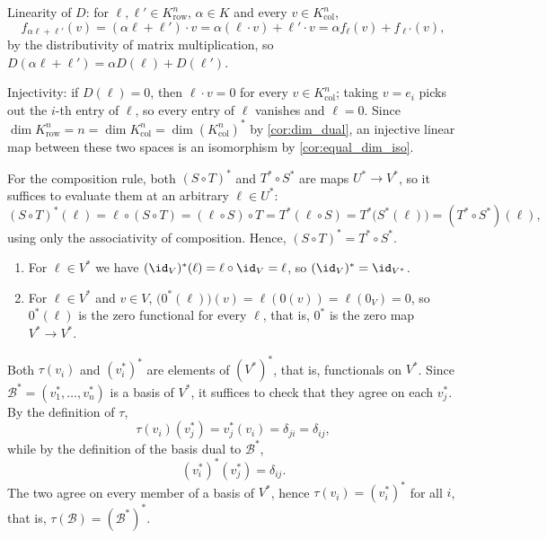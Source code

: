 \begin{exercisesolution}
\label{sol:row_space_is_dual}
Linearity of $D$: for $\ell, \ell' \in K^n_{\text{row}}$, $\alpha \in K$ and every $v \in K^n_{\text{col}}$,
\[
f_{\alpha \ell + \ell'}(v) = (\alpha \ell + \ell') \cdot v = \alpha (\ell \cdot v) + \ell' \cdot v = \alpha f_{\ell}(v) + f_{\ell'}(v),
\]
by the distributivity of matrix multiplication, so $D(\alpha \ell + \ell') = \alpha D(\ell) + D(\ell')$.

Injectivity: if $D(\ell) = 0$, then $\ell \cdot v = 0$ for every $v \in K^n_{\text{col}}$; taking $v = e_i$ picks out the $i$-th entry of $\ell$, so every entry of $\ell$ vanishes and $\ell = 0$. Since $\dim K^n_{\text{row}} = n = \dim K^n_{\text{col}} = \dim (K^n_{\text{col}})^*$ by \cref{cor:dim_dual}, an injective linear map between these two spaces is an isomorphism by \cref{cor:equal_dim_iso}.
\end{exercisesolution}

\begin{exercisesolution}
\label{sol:dual_functoriality}
For the composition rule, both $(S \circ T)^*$ and $T^* \circ S^*$ are maps $U^* \to V^*$, so it suffices to evaluate them at an arbitrary $\ell \in U^*$:
\[
(S \circ T)^*(\ell) = \ell \circ (S \circ T) = (\ell \circ S) \circ T = T^*(\ell \circ S) = T^*\big(S^*(\ell)\big) = (T^* \circ S^*)(\ell),
\]
using only the associativity of composition. Hence, $(S \circ T)^* = T^* \circ S^*$.

\begin{enumerate}[label=\textbf{(\alph*)}]
    \item For $\ell \in V^*$ we have $(\id_V)^*(\ell) = \ell \circ \id_V = \ell$, so $(\id_V)^* = \id_{V^*}$.
    \item For $\ell \in V^*$ and $v \in V$, $\big(0^*(\ell)\big)(v) = \ell(0(v)) = \ell(0_V) = 0$, so $0^*(\ell)$ is the zero functional for every $\ell$, that is, $0^*$ is the zero map $V^* \to V^*$. \qedhere
\end{enumerate}
\end{exercisesolution}

\begin{exercisesolution}
\label{sol:tau_on_dual_bases}
Both $\tau(v_i)$ and $(v_i^*)^*$ are elements of $(V^*)^*$, that is, functionals on $V^*$. Since $\mathcal{B}^* = (v_1^*, \dots, v_n^*)$ is a basis of $V^*$, it suffices to check that they agree on each $v_j^*$. By the definition of $\tau$,
\[
\tau(v_i)(v_j^*) = v_j^*(v_i) = \delta_{ji} = \delta_{ij},
\]
while by the definition of the basis dual to $\mathcal{B}^*$,
\[
(v_i^*)^*(v_j^*) = \delta_{ij}.
\]
The two agree on every member of a basis of $V^*$, hence $\tau(v_i) = (v_i^*)^*$ for all $i$, that is, $\tau(\mathcal{B}) = (\mathcal{B}^*)^*$.
\end{exercisesolution}

